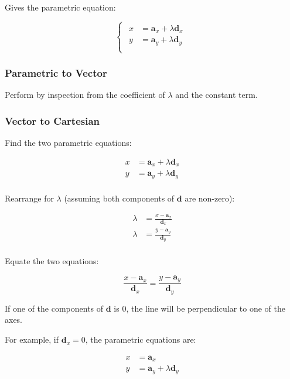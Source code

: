 \documentclass[a4paper,11pt]{article}
\newcommand{\bb}{\boldsymbol}
\begin{document}
Gives the parametric equation:

$$
\begin{cases}
\begin{aligned}
x & = \bb{a}_x + \lambda \bb{d}_x \\
y & = \bb{a}_y + \lambda \bb{d}_y \\
\end{aligned}
\end{cases}
$$


\subsubsection{Parametric to Vector}

Perform by inspection from the coefficient of $\lambda$ and the constant
term.


\subsubsection{Vector to Cartesian}

Find the two parametric equations:

$$
\begin{aligned}
x & = \bb{a}_x + \lambda \bb{d}_x \\
y & = \bb{a}_y + \lambda \bb{d}_y \\
\end{aligned}
$$

Rearrange for $\lambda$ (assuming both components of $\bb{d}$ are non-zero):

$$
\begin{aligned}
\lambda & = \frac{x - \bb{a}_x}{\bb{d}_x} \\
\lambda & = \frac{y - \bb{a}_y}{\bb{d}_y} \\
\end{aligned}
$$

Equate the two equations:

$$
\frac{x - \bb{a}_x}{\bb{d}_x} = \frac{y - \bb{a}_y}{\bb{d}_y}
$$

If one of the components of $\bb{d}$ is 0, the line will be perpendicular to
one of the axes.

For example, if $\bb{d}_x = 0$, the parametric equations are:

$$
\begin{aligned}
x & = \bb{a}_x \\
y & = \bb{a}_y + \lambda \bb{d}_y \\
\end{aligned}
$$
\end{document}
